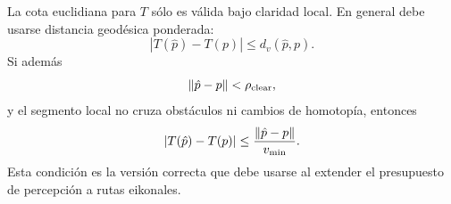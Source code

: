 La cota euclidiana para $T$ sólo es válida bajo claridad local. En general debe usarse
distancia geodésica ponderada:
\begin{equation}
  |T(\hat p)-T(p)|\le d_v(\hat p,p).
  \label{eq:anexo_cota_geodesica}
\end{equation}
Si además
\begin{equation}
  \left\|\hat p-p\right\|<\rho_{\mathrm{clear}},
  \label{eq:anexo_condicion_claridad}
\end{equation}
y el segmento local no cruza obstáculos ni cambios de homotopía, entonces
\begin{equation}
  |T(\hat p)-T(p)|
  \le
  \frac{\left\|\hat p-p\right\|}{v_{\min}}.
  \label{eq:anexo_cota_euclidiana_claridad}
\end{equation}
Esta condición es la versión correcta que debe usarse al extender el presupuesto de
percepción a rutas eikonales.
